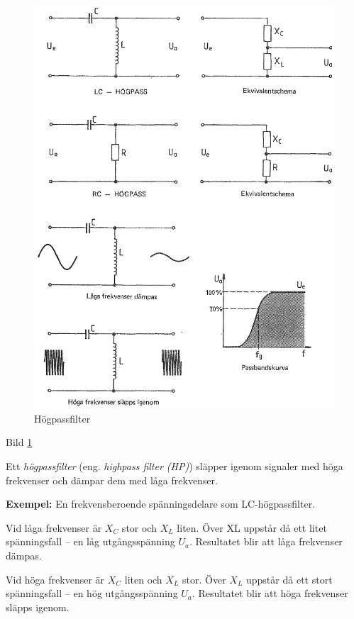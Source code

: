 \begin{figure}
\includegraphics[width=\textwidth]{images/cropped_pdfs/bild_2_3-22.pdf}
\caption{Högpassfilter}
\label{fig:BildII3-22}
\end{figure}

Bild \ref{fig:BildII3-22}

Ett \emph{högpassfilter} (eng. \emph{highpass filter (HP)}) släpper igenom
signaler med höga frekvenser och dämpar dem med låga frekvenser.

\textbf{Exempel:} En frekvensberoende spänningsdelare som LC-högpassfilter.

Vid låga frekvenser är \(X_C\) stor och \(X_L\) liten.
Över XL uppstår då ett litet spänningsfall -- en låg utgångsspänning \(U_a\).
Resultatet blir att låga frekvenser dämpas.

Vid höga frekvenser är \(X_C\) liten och \(X_L\) stor.
Över \(X_L\) uppstår då ett stort spänningsfall -- en hög utgångsspänning
\(U_a\).
Resultatet blir att höga frekvenser släpps igenom.

